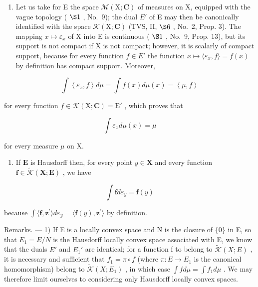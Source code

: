 \begin{enumerate}
\def\labelenumi{\arabic{enumi})}
\setcounter{enumi}{1}
\tightlist
\item
  Let us take for E the space \(\mathcal{M}(\mathrm{X};\mathbf{C})\) of measures on X, equipped with the vague topology ( \(\S1\) , No.~9); the dual \(E'\) of E may then be canonically identified with the space \(\mathcal{K}(\mathrm{X};\mathbf{C})\) (TVS, II, \(\S6\) , No.~2, Prop. 3). The mapping \(x \mapsto \varepsilon_{x}\) of X into E is continuous ( \(\S1\) , No.~9, Prop. 13), but its support is not compact if X is not compact; however, it is scalarly of compact support, because for every function \(f \in E'\) the function \(x \mapsto \langle \varepsilon_x, f \rangle = f(x)\) by definition has compact support. Moreover,
\end{enumerate}

\[
\int \left\langle \varepsilon_ {x}, f \right\rangle d \mu = \int f (x) d \mu (x) = \left\langle \mu , f \right\rangle
\]

for every function \(f \in \mathcal{K}(\mathrm{X};\mathbf{C}) = \mathrm{E}'\) , which proves that

\[
\int \varepsilon_ {x} d \mu (x) = \mu
\]

for every measure \(\mu\) on X.

\begin{enumerate}
\def\labelenumi{\arabic{enumi})}
\setcounter{enumi}{2}
\tightlist
\item
  If \(\mathbf{E}\) is Hausdorff then, for every point \(y \in \mathbf{X}\) and every function \(\mathbf{f} \in \widetilde{\mathcal{K}}(\mathbf{X};\mathbf{E})\) , we have
\end{enumerate}

\[
\int \mathbf {f} d \varepsilon_ {y} = \mathbf {f} (y)
\]

because \(\int \langle \mathbf{f},\mathbf{z}^{\prime}\rangle d\varepsilon_{y} = \langle \mathbf{f}(y),\mathbf{z}^{\prime}\rangle\) by definition.

Remarks. --- 1) If E is a locally convex space and N is the closure of \(\{0\}\) in E, so that \(E_{1} = E/N\) is the Hausdorff locally convex space associated with E, we know that the duals \(E'\) and \(E_{1}'\) are identical; for a function f to belong to \(\widetilde{\mathcal{K}}(X;E)\) , it is necessary and sufficient that \(f_{1} = \pi \circ f\) (where \(\pi : E \to E_{1}\) is the canonical homomorphism) belong to \(\widetilde{\mathcal{K}}(X;E_{1})\) , in which case \(\int f d\mu = \int f_{1} d\mu\) . We may therefore limit ourselves to considering only Hausdorff locally convex spaces.

